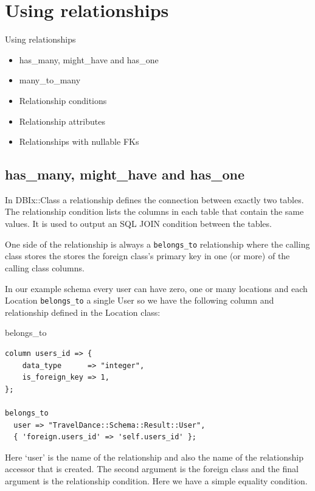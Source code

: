 \section{Using relationships}

\begin{frame}{Using relationships}
\begin{itemize}
\item has\_many, might\_have and has\_one
\item many\_to\_many
\item Relationship conditions
\item Relationship attributes
\item Relationships with nullable FKs
\end{itemize}
\end{frame}

\subsection{has\_many, might\_have and has\_one}

In DBIx::Class a relationship defines the connection between exactly two
tables. The relationship condition lists the columns in each table that
contain the same values. It is used to output an SQL JOIN condition between
the tables.

One side of the relationship is always a \verb|belongs_to| relationship
where the calling class stores the stores the foreign class’s primary key in
one (or more) of the calling class columns.

In our example schema every user can have zero, one or many locations and
each Location \verb|belongs_to| a single User so we have the following column and
relationship defined in the Location class: 
 
\begin{frame}[fragile]{belongs\_to}
\begin{lstlisting}
column users_id => {
    data_type      => "integer",
    is_foreign_key => 1,
};

belongs_to
  user => "TravelDance::Schema::Result::User",
  { 'foreign.users_id' => 'self.users_id' };
\end{lstlisting}
\end{frame}

Here ‘user’ is the name of the relationship and also the name of the relationship accessor that is created. The second argument is the foreign class and the final argument is the relationship condition. Here we have a simple equality condition.

